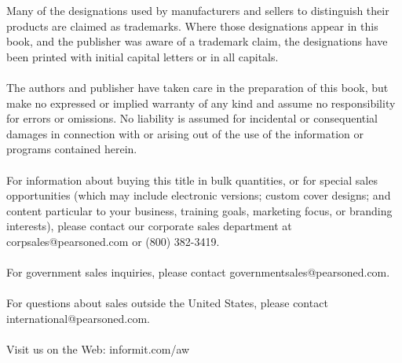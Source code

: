 \thispagestyle{empty}
\vspace*{\fill}
{\footnotesize 
\noindent Many of the designations used by manufacturers and sellers to distinguish their products are claimed as trademarks. Where those designations appear in this book, and the publisher was aware of a trademark claim, the designations have been printed with initial capital letters or in all capitals.\\
\hspace{\fill}\\
\noindent The authors and publisher have taken care in the preparation of this book, but make no expressed or implied warranty of any kind and assume no responsibility for errors or omissions. No liability is assumed for incidental or consequential damages in connection with or arising out of the use of the information or programs contained herein.\\   %
\hspace{\fill}\\
\noindent For information about buying this title in bulk quantities, or for special sales opportunities (which may include electronic versions; custom cover designs; and content particular to your business, training goals, marketing focus, or branding interests), please contact our corporate sales department at \mbox{corpsales}\linebreak[3]@\linebreak[3]pearsoned\linebreak[3].com or (800) 382-3419.\\
\hspace{\fill}\\
\noindent For government sales inquiries, please contact governmentsales@pearsoned.com.\\
\hspace{\fill}\\
\noindent For questions about sales outside the United States, please contact international@pearsoned.com.\\
\hspace{\fill}\\
\noindent Visit us on the Web: informit.com/aw\\     %
\hspace{\fill}\\
}
